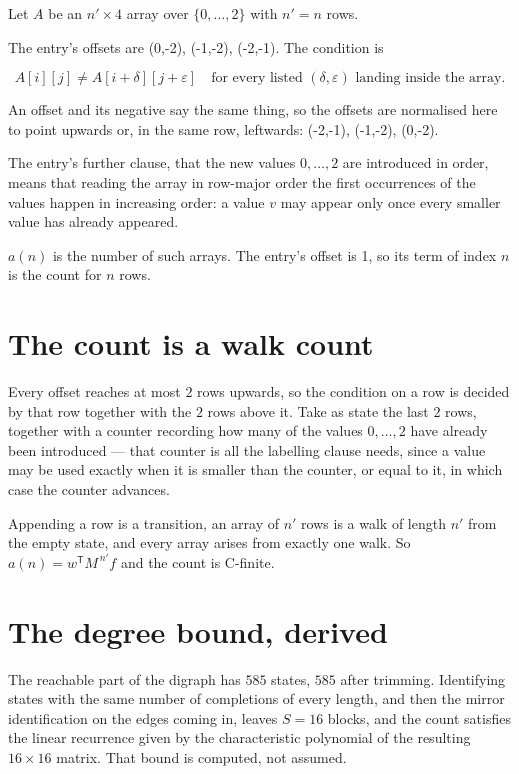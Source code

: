 \documentclass[11pt]{article}
\theoremstyle{definition}
\begin{document}
Let $A$ be an $n' \times 4$ array over $\{0,\dots,2\}$ with $n' = n$ rows.

The entry's offsets are (0,-2), (-1,-2), (-2,-1). The condition is

\[A[i][j] \ne A[i{+}\delta][j{+}\varepsilon]\quad\text{for every listed }(\delta,\varepsilon)\text{ landing inside the array.}\]

An offset and its negative say the same thing, so the offsets are normalised here to point upwards or, in the same row, leftwards: (-2,-1), (-1,-2), (0,-2).

The entry's further clause, that the new values $0,\dots,2$ are introduced in order, means that reading the array in row-major order the first occurrences of the values happen in increasing order: a value $v$ may appear only once every smaller value has already appeared.

$a(n)$ is the number of such arrays. The entry's offset is 1, so its term of index $n$ is the count for $n$ rows.

\section{The count is a walk count}

Every offset reaches at most $2$ rows upwards, so the condition on a row is decided by that row together with the $2$ rows above it. Take as state the last $2$ rows, together with a counter recording how many of the values $0,\dots,2$ have already been introduced --- that counter is all the labelling clause needs, since a value may be used exactly when it is smaller than the counter, or equal to it, in which case the counter advances.

Appending a row is a transition, an array of $n'$ rows is a walk of length $n'$ from the empty state, and every array arises from exactly one walk. So $a(n) = w^{\mathsf T}M^{\,n'}f$ and the count is C-finite.

\section{The degree bound, derived}

The reachable part of the digraph has $585$ states, $585$ after trimming. Identifying states with the same number of completions of every length, and then the mirror identification on the edges coming in, leaves $S = 16$ blocks, and the count satisfies the linear recurrence given by the characteristic polynomial of the resulting $16\times16$ matrix. That bound is computed, not assumed.
\end{document}
